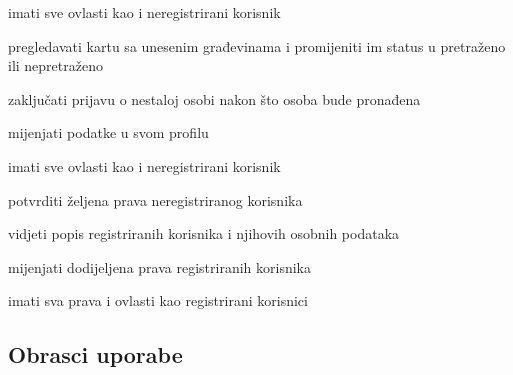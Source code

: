\begin{packed_enum}
\begin{packed_enum}
					
				\end{packed_enum}
				
				\item  {}
				
				\begin{packed_enum}

                        \item imati sve ovlasti kao i neregistrirani korisnik
					\item pregledavati kartu sa unesenim građevinama i promijeniti im status u pretraženo ili nepretraženo
					\item zaključati prijavu o nestaloj osobi nakon što osoba bude pronađena
					\item mijenjati podatke u svom profilu

				
				\end{packed_enum}
				
				\item  {}
				
				\begin{packed_enum}

                        \item imati sve ovlasti kao i neregistrirani korisnik
					\item potvrditi željena prava neregistriranog korisnika
					\item vidjeti popis registriranih korisnika i njihovih osobnih podataka
					\item mijenjati dodijeljena prava registriranih korisnika
					\item imati sva prava i ovlasti kao registrirani korisnici

				
				\end{packed_enum}
				
				
				
			\end{packed_enum}
			
			
			\eject 
			
			
				
			\subsection{Obrasci uporabe}
					
